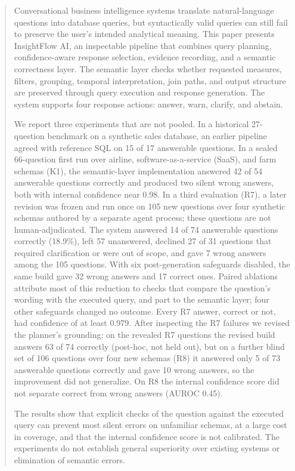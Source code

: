 \documentclass[conference]{IEEEtran}
\begin{document}
\begin{abstract}
Conversational business intelligence systems translate natural-language questions into database queries, but syntactically valid queries can still fail to preserve the user's intended analytical meaning. This paper presents InsightFlow AI, an inspectable pipeline that combines query planning, confidence-aware response selection, evidence recording, and a semantic correctness layer. The semantic layer checks whether requested measures, filters, grouping, temporal interpretation, join paths, and output structure are preserved through query execution and response generation. The system supports four response actions: answer, warn, clarify, and abstain.

We report three experiments that are not pooled. In a historical 27-question benchmark on a synthetic sales database, an earlier pipeline agreed with reference SQL on 15 of 17 answerable questions. In a sealed 66-question first run over airline, software-as-a-service (SaaS), and farm schemas (K1), the semantic-layer implementation answered 42 of 54 answerable questions correctly and produced two silent wrong answers, both with internal confidence near 0.98. In a third evaluation (R7), a later revision was frozen and run once on 105 new questions over four synthetic schemas authored by a separate agent process; these questions are not human-adjudicated. The system answered 14 of 74 answerable questions correctly (18.9\%), left 57 unanswered, declined 27 of 31 questions that required clarification or were out of scope, and gave 7 wrong answers among the 105 questions. With six post-generation safeguards disabled, the same build gave 32 wrong answers and 17 correct ones. Paired ablations attribute most of this reduction to checks that compare the question's wording with the executed query, and part to the semantic layer; four other safeguards changed no outcome. Every R7 answer, correct or not, had confidence of at least 0.979. After inspecting the R7 failures we revised the planner's grounding; on the revealed R7 questions the revised build answers 63 of 74 correctly (post-hoc, not held out), but on a further blind set of 106 questions over four new schemas (R8) it answered only 5 of 73 answerable questions correctly and gave 10 wrong answers, so the improvement did not generalize. On R8 the internal confidence score did not separate correct from wrong answers (AUROC 0.45).

The results show that explicit checks of the question against the executed query can prevent most silent errors on unfamiliar schemas, at a large cost in coverage, and that the internal confidence score is not calibrated. The experiments do not establish general superiority over existing systems or elimination of semantic errors.
\end{abstract}
\end{document}
